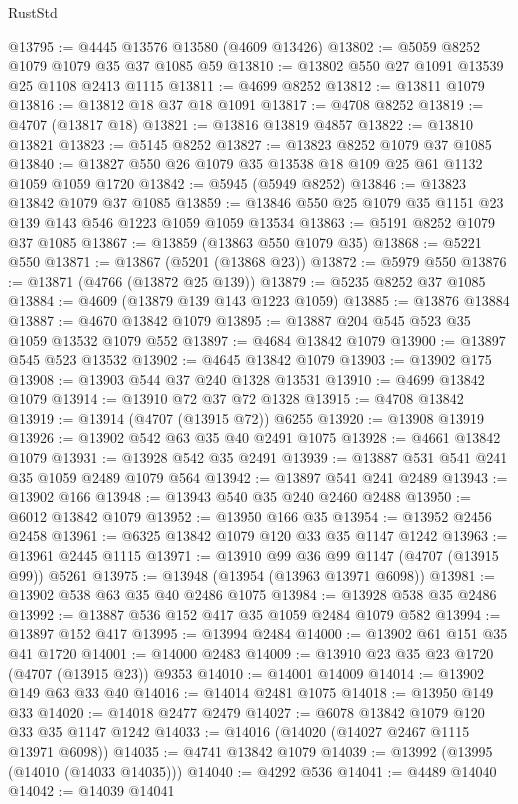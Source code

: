 \begin{lexlean}{RustStd}
\begin{coremodule}
{\begin{coremodule}
{{{{{{{{{{{{{{{{{{{{{{{{{{{{{{{{{{{@13795 := @4445 @13576 @13580 (@4609 @13426)
@13802 := @5059 @8252 @1079 @1079 @35 @37 @1085 @59
@13810 := @13802 @550 @27 @1091 @13539 @25 @1108 @2413 @1115
@13811 := @4699 @8252
@13812 := @13811 @1079
@13816 := @13812 @18 @37 @18 @1091
@13817 := @4708 @8252
@13819 := @4707 (@13817 @18)
@13821 := @13816 @13819 @4857
@13822 := @13810 @13821
@13823 := @5145 @8252
@13827 := @13823 @8252 @1079 @37 @1085
@13840 := @13827 @550 @26 @1079 @35 @13538 @18 @109 @25 @61 @1132 @1059 @1059 @1720
@13842 := @5945 (@5949 @8252)
@13846 := @13823 @13842 @1079 @37 @1085
@13859 := @13846 @550 @25 @1079 @35 @1151 @23 @139 @143 @546 @1223 @1059 @1059 @13534
@13863 := @5191 @8252 @1079 @37 @1085
@13867 := @13859 (@13863 @550 @1079 @35)
@13868 := @5221 @550
@13871 := @13867 (@5201 (@13868 @23))
@13872 := @5979 @550
@13876 := @13871 (@4766 (@13872 @25 @139))
@13879 := @5235 @8252 @37 @1085
@13884 := @4609 (@13879 @139 @143 @1223 @1059)
@13885 := @13876 @13884
@13887 := @4670 @13842 @1079
@13895 := @13887 @204 @545 @523 @35 @1059 @13532 @1079 @552
@13897 := @4684 @13842 @1079
@13900 := @13897 @545 @523 @13532
@13902 := @4645 @13842 @1079
@13903 := @13902 @175
@13908 := @13903 @544 @37 @240 @1328 @13531
@13910 := @4699 @13842 @1079
@13914 := @13910 @72 @37 @72 @1328
@13915 := @4708 @13842
@13919 := @13914 (@4707 (@13915 @72)) @6255
@13920 := @13908 @13919
@13926 := @13902 @542 @63 @35 @40 @2491 @1075
@13928 := @4661 @13842 @1079
@13931 := @13928 @542 @35 @2491
@13939 := @13887 @531 @541 @241 @35 @1059 @2489 @1079 @564
@13942 := @13897 @541 @241 @2489
@13943 := @13902 @166
@13948 := @13943 @540 @35 @240 @2460 @2488
@13950 := @6012 @13842 @1079
@13952 := @13950 @166 @35
@13954 := @13952 @2456 @2458
@13961 := @6325 @13842 @1079 @120 @33 @35 @1147 @1242
@13963 := @13961 @2445 @1115
@13971 := @13910 @99 @36 @99 @1147 (@4707 (@13915 @99)) @5261
@13975 := @13948 (@13954 (@13963 @13971 @6098))
@13981 := @13902 @538 @63 @35 @40 @2486 @1075
@13984 := @13928 @538 @35 @2486
@13992 := @13887 @536 @152 @417 @35 @1059 @2484 @1079 @582
@13994 := @13897 @152 @417
@13995 := @13994 @2484
@14000 := @13902 @61 @151 @35 @41 @1720
@14001 := @14000 @2483
@14009 := @13910 @23 @35 @23 @1720 (@4707 (@13915 @23)) @9353
@14010 := @14001 @14009
@14014 := @13902 @149 @63 @33 @40
@14016 := @14014 @2481 @1075
@14018 := @13950 @149 @33
@14020 := @14018 @2477 @2479
@14027 := @6078 @13842 @1079 @120 @33 @35 @1147 @1242
@14033 := @14016 (@14020 (@14027 @2467 @1115 @13971 @6098))
@14035 := @4741 @13842 @1079
@14039 := @13992 (@13995 (@14010 (@14033 @14035)))
@14040 := @4292 @536
@14041 := @4489 @14040
@14042 := @14039 @14041
}}}}}}}}}}}}}}}}}}}}}}}}}}}}}}}}}}}
\end{coremodule}}
\end{coremodule}
\end{lexlean}
